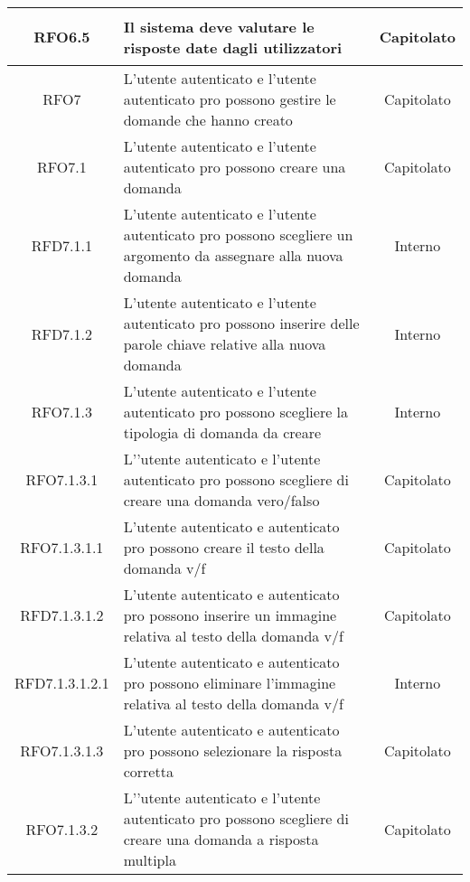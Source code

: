 \begin{longtable}{|c|>{\centering}m{7cm}|c|}
\hypertarget{RFO6.5}{RFO6.5} & Il sistema deve valutare le risposte date dagli utilizzatori & Capitolato
\\ \hline

\hypertarget{RFO7}{RFO7} & L’utente autenticato e l’utente autenticato pro possono gestire le domande che hanno creato & Capitolato
\\ \hline

\hypertarget{RFO7.1}{RFO7.1} & L’utente autenticato e l’utente autenticato pro possono creare una domanda  & Capitolato
\\ \hline

\hypertarget{RFD7.1.1}{RFD7.1.1} & L’utente autenticato e l’utente autenticato pro possono scegliere un argomento da assegnare alla nuova domanda  & Interno
\\ \hline

\hypertarget{RFD7.1.2}{RFD7.1.2} & L’utente autenticato e l’utente autenticato pro possono inserire delle parole chiave relative alla nuova domanda & Interno
\\ \hline

\hypertarget{RFO7.1.3}{RFO7.1.3} & L’utente autenticato e l’utente autenticato pro possono scegliere la tipologia  di domanda da creare  & Interno
\\ \hline

\hypertarget{RFO7.1.3.1}{RFO7.1.3.1} & L’’utente autenticato e l’utente autenticato pro possono scegliere di creare una domanda vero/falso & Capitolato
\\ \hline

\hypertarget{RFO7.1.3.1.1}{RFO7.1.3.1.1} & L’utente autenticato e autenticato pro possono creare il testo della domanda v/f  & Capitolato
\\ \hline

\hypertarget{RFD7.1.3.1.2}{RFD7.1.3.1.2} & L’utente autenticato e autenticato pro possono inserire un immagine relativa al testo della domanda v/f & Capitolato
\\ \hline

\hypertarget{RFD7.1.3.1.2.1}{RFD7.1.3.1.2.1} & L’utente autenticato e autenticato pro possono eliminare l’immagine relativa al testo della domanda v/f  & Interno
\\ \hline

\hypertarget{RFO7.1.3.1.3}{RFO7.1.3.1.3} & L’utente autenticato e autenticato pro possono selezionare la risposta corretta  & Capitolato
\\ \hline

\hypertarget{RFO7.1.3.2}{RFO7.1.3.2} & L’’utente autenticato e l’utente autenticato pro possono scegliere di creare una domanda a risposta multipla & Capitolato
\\ \hline


\end{longtable}
